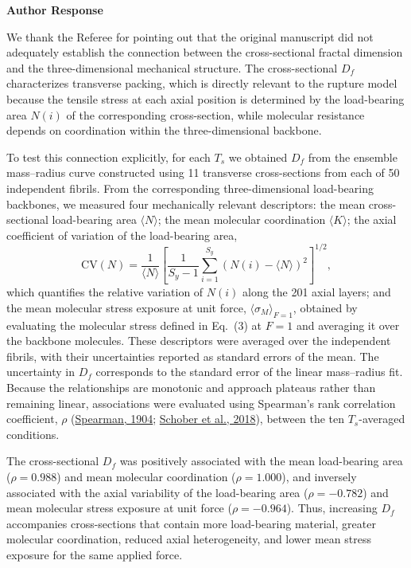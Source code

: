 \documentclass[11pt]{article}
\newcommand{\responselabel}{%
  \par\medskip
  {\color{responseblue}\bfseries Author Response}\par
}
\begin{document}
\responselabel
We thank the Referee for pointing out that the original manuscript did not
adequately establish the connection between the cross-sectional fractal
dimension and the three-dimensional mechanical structure. The cross-sectional
\(D_f\) characterizes transverse packing, which is directly relevant to the
rupture model because the tensile stress at each axial position is determined
by the load-bearing area \(N(i)\) of the corresponding cross-section, while
molecular resistance depends on coordination within the three-dimensional
backbone.

To test this connection explicitly, for each \(T_s\) we obtained \(D_f\) from
the ensemble mass--radius curve constructed using 11 transverse cross-sections
from each of 50 independent fibrils. From the corresponding three-dimensional
load-bearing backbones, we measured four mechanically relevant descriptors:
the mean cross-sectional load-bearing area \(\langle N\rangle\); the mean
molecular coordination \(\langle K\rangle\); the axial coefficient of
variation of the load-bearing area,
\[
  \mathrm{CV}(N)=
  \frac{1}{\langle N\rangle}
  \left[
    \frac{1}{S_y-1}
    \sum_{i=1}^{S_y}\left(N(i)-\langle N\rangle\right)^2
  \right]^{1/2},
\]
which quantifies the relative variation of \(N(i)\) along the 201 axial layers;
and the mean molecular stress exposure at unit force,
\(\langle\sigma_M\rangle_{F=1}\), obtained by evaluating the molecular stress
defined in Eq.~(3) at \(F=1\) and averaging it over the backbone molecules.
These descriptors were averaged over the independent fibrils, with their
uncertainties reported as standard errors of the mean. The uncertainty in
\(D_f\) corresponds to the standard error of the linear mass--radius fit.
Because the relationships are monotonic and approach plateaus rather than
remaining linear, associations were evaluated using Spearman's rank
correlation coefficient, \(\rho\)
(\href{https://doi.org/10.2307/1412159}{Spearman, 1904};
\href{https://doi.org/10.1213/ANE.0000000000002864}{Schober et al., 2018}),
between the ten \(T_s\)-averaged conditions.

The cross-sectional \(D_f\) was positively associated with the mean
load-bearing area (\(\rho=0.988\)) and mean molecular coordination
(\(\rho=1.000\)), and inversely associated with the axial variability of the
load-bearing area (\(\rho=-0.782\)) and mean molecular stress exposure at unit
force (\(\rho=-0.964\)). Thus, increasing \(D_f\) accompanies cross-sections
that contain more load-bearing material, greater molecular coordination,
reduced axial heterogeneity, and lower mean stress exposure for the same
applied force.
\end{document}
